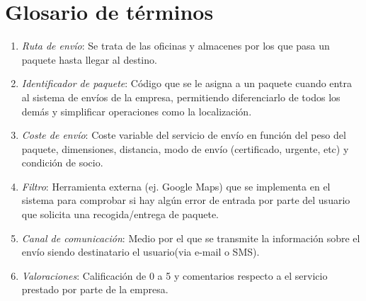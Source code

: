\section{Glosario de términos}
	\begin{enumerate}
		\item \textit{Ruta de envío}: Se trata de las oficinas y almacenes por los que pasa un paquete hasta llegar al destino.
		\item \textit{Identificador de paquete}: Código que se le asigna a un paquete cuando entra al sistema de envíos de la empresa, permitiendo diferenciarlo de todos los demás y simplificar operaciones como la localización.
		\item \textit{Coste de envío}: Coste variable del servicio de envío en función del peso del paquete, dimensiones, distancia, modo de envío (certificado, urgente, etc) y condición de socio.
		\item \textit{Filtro}: Herramienta externa (ej. Google Maps) que se implementa  en el sistema para comprobar si hay algún error de entrada por parte del usuario que solicita una recogida/entrega de paquete.
		\item \textit{Canal de comunicación}: Medio por el que se transmite la información sobre el envío siendo destinatario el usuario(via e-mail o SMS).
		\item \textit{Valoraciones}: Calificación de 0 a 5 y comentarios respecto a el servicio prestado por parte de la empresa.
		
 	\end{enumerate}
\newpage


